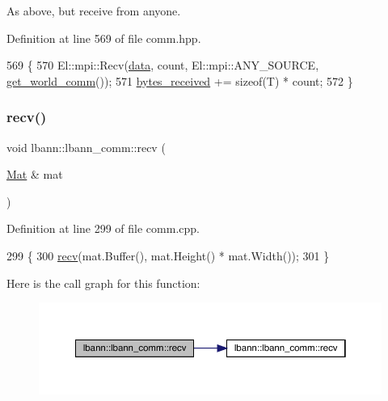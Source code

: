 As above, but receive from anyone. 

Definition at line 569 of file comm.\+hpp.


\begin{DoxyCode}
569                                                       \{
570     El::mpi::Recv(\hyperlink{namespacelbann_1_1cnpy__utils_a9ac86d96ccb1f8b4b2ea16441738781f}{data}, count, El::mpi::ANY\_SOURCE, \hyperlink{classlbann_1_1lbann__comm_a0493f1f0c42b95674daacf5288fdb073}{get\_world\_comm}());
571     \hyperlink{classlbann_1_1lbann__comm_afb99f57f7eafc0695bf28e6c26a8120f}{bytes\_received} += \textcolor{keyword}{sizeof}(T) * count;
572   \}
\end{DoxyCode}
\mbox{\label{classlbann_1_1lbann__comm_a3d0cca55711c9c9913f3d940c5bba4eb}} 
\subsubsection{\texorpdfstring{recv()}{recv()}\hspace{0.1cm}{\footnotesize\ttfamily [8/9]}}
{\footnotesize\ttfamily void lbann\+::lbann\+\_\+comm\+::recv (\begin{DoxyParamCaption}\item[{\hyperlink{base_8hpp_a68f11fdc31b62516cb310831bbe54d73}{Mat} \&}]{mat }\end{DoxyParamCaption})}



Definition at line 299 of file comm.\+cpp.


\begin{DoxyCode}
299                               \{
300   \hyperlink{classlbann_1_1lbann__comm_af8842cd4cea390f76d9146e1c4578de4}{recv}(mat.Buffer(), mat.Height() * mat.Width());
301 \}
\end{DoxyCode}
Here is the call graph for this function\+:\nopagebreak
\begin{figure}[H]
\begin{center}
\leavevmode
\includegraphics[width=350pt]{classlbann_1_1lbann__comm_a3d0cca55711c9c9913f3d940c5bba4eb_cgraph}
\end{center}
\end{figure}
\mbox{\label{classlbann_1_1lbann__comm_acc92b86b30287689870e018b062076f8}} 
